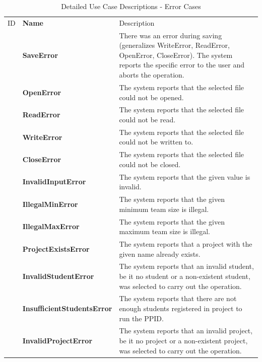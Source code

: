 \documentclass[12pt,letterpaper]{article}
\begin{document}
\begin{table}[H]
	\caption{Detailed Use Case Descriptions - Error Cases}
	\vspace{1em}
	\begin{tabu} to 
	    \tableheader{}ID & Name & Description\\
		\saveerror{} & SaveError & There was an error during saving (generalizes WriteError, ReadError, OpenError, CloseError). 
		The system reports the specific error to the user and aborts the operation.\\
		\openerror{} & OpenError & The system reports that the selected file could not be opened.\\
		\readerror{} & ReadError & The system reports that the selected file could not be read.\\
		\writeerror{} & WriteError & The system reports that the selected file could not be written to.\\
		\closeerror{} & CloseError & The system reports that the selected file could not be closed.\\
		\invalidinputerror{} & InvalidInputError & The system reports that the given value is invalid.\\
		\illegalminerror{} & IllegalMinError & The system reports that the given minimum team size is illegal.\\
		\illegalmaxerror{} & IllegalMaxError & The system reports that the given maximum team size is illegal.\\
		\projectexistserror{} & ProjectExistsError & The system reports that a project with the given name already exists.\\
		\invalidstudenterror{} & InvalidStudentError & The system reports that an invalid student, be it no student or a non-existent student, was selected to carry out the operation.\\
		\insufficientstudentserror{} & InsufficientStudentsError & The system reports that there are not enough students registered in project to
		 run the PPID.\\
        \invalidprojecterror{} & InvalidProjectError & The system reports that an invalid project, be it no project or a non-existent project, was selected to carry out the operation.\\
	\end{tabu}
\end{table}
\end{document}
